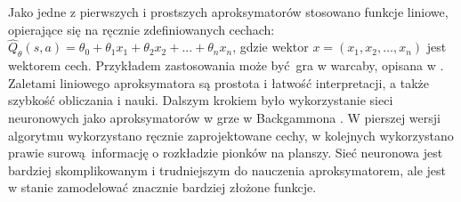 Jako jedne z pierwszych i prostszych aproksymatorów stosowano funkcje liniowe, opierające się na ręcznie zdefiniowanych cechach: $\hat{Q}_{\theta}(s,a) = \theta_0 + \theta_1x_1 + \theta_2x_2 + ... + \theta_nx_n$, gdzie wektor $x = (x_1, x_2, …, x_n)$ jest wektorem cech. Przykładem zastosowania może być gra w warcaby, opisana w \cite{Samuel:1959:SML:1661923.1661924}. Zaletami liniowego aproksymatora są prostota i łatwość interpretacji, a także szybkość obliczania i nauki. 
Dalszym krokiem było wykorzystanie sieci neuronowych jako aproksymatorów w grze w Backgammona \cite{Tesauro1992451}. W pierszej wersji algorytmu wykorzystano ręcznie zaprojektowane cechy, w kolejnych wykorzystano prawie surową informację o rozkładzie pionków na planszy. Sieć neuronowa jest bardziej skomplikowanym i trudniejszym do nauczenia aproksymatorem, ale jest w stanie zamodelować znacznie bardziej złożone funkcje.
